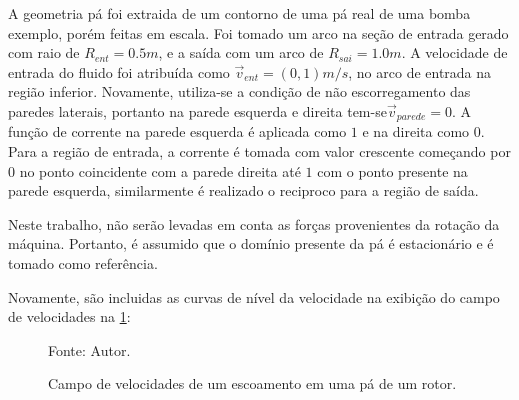 A geometria pá foi extraida de um contorno de uma pá real de uma bomba exemplo, porém feitas em escala.
Foi tomado um arco na seção de entrada gerado com raio de $R_{ent}=0.5m$, e a saída com um arco de $R_{sai}=1.0m$.
A velocidade de entrada do fluido foi atribuída como $\vec{v}_{ent}=(0, 1)m/s$, no arco de entrada na região inferior.
Novamente, utiliza-se a condição de não escorregamento das paredes laterais, portanto na parede esquerda e direita tem-se$\vec{v}_{parede}=0$.
A função de corrente na parede esquerda é aplicada como $1$ e na direita como $0$.
Para a região de entrada, a corrente é tomada com valor crescente começando por $0$ no ponto coincidente com a parede direita até $1$ com o ponto presente na parede esquerda, similarmente é realizado o reciproco para a região de saída.

Neste trabalho, não serão levadas em conta as forças provenientes da rotação da máquina.
Portanto, é assumido que o domínio presente da pá é estacionário e é tomado como referência.

Novamente, são incluidas as curvas de nível da velocidade na exibição do campo de velocidades na \ref{rotor_result}:
\begin{figure}[H]
    \centering
     {\raggedleft \scriptsize Fonte: Autor.}
    \caption{Campo de velocidades de um escoamento em uma pá de um rotor.}
    \label{rotor_result}
\end{figure}

